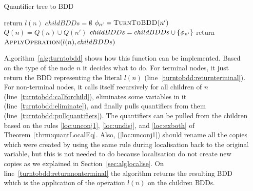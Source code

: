 \documentclass[
  digital, %
  color,
  twoside, %
  table,   %
  nolof,     %
  nolot,     %
]{fithesis3}
\let\setbuilder\set
\newcommand{\simpleset}[1]{\{{#1}\}}
\renewcommand{\set}[1]{\normalexpandarg\IfSubStr{#1}{|}{\setbuilder{#1}}{\simpleset{#1}}}
\theoremstyle{definition}
\theoremstyle{remark}
\newcommand{\qtlabel}[1]{l({#1})}
\newcommand{\prefix}[1]{Q({#1})}
\newcommand{\children}[1]{children({#1})}
\begin{document}
\begin{algorithm}
  \caption{Quantifier tree to BDD}
  \label{alg:turntobdd}
  \begin{algorithmic}[1]
      \If{$\qtlabel{n}$ is a literal}
        \State return $\qtlabel{n}$ \label{turntobdd:returnterminal}
      \Else
        \State $childBDDs = \emptyset$
        \ForAll{$n' \in \children{n}$}
          \State $\phi_{n'} = \Call{TurnToBDD}{n'}$ \label{turntobdd:callforchild}
          \State {} \label{turntobdd:eliminate}
          \State $\prefix{n} = \prefix{n} \cup \prefix{n'}$ \label{turntobdd:pullquantifiers}
          \State $childBDDs = childBDDs \cup \set{\phi_{n'}}$ %
        \EndFor
        \State return $\Call{ApplyOperation}{\qtlabel{n}, childBDDs}$ \label{turntobdd:returnnonterminal}
      \EndIf
    \EndFunction
  \end{algorithmic}
\end{algorithm}

Algorithm~\ref{alg:turntobdd} shows how this function can be implemented. Based on the type of the node $n$ it decides what to do. For terminal nodes, it just return the BDD representing the literal $\qtlabel{n}$ (line~\ref{turntobdd:returnterminal}). For non-terminal nodes, it calls itself recursively for all children of $n$ (line~\ref{turntobdd:callforchild}), eliminates some variables in it (line~\ref{turntobdd:eliminate}), and finally pulls quantifiers from them (line~\ref{turntobdd:pullquantifiers}). The quantifiers can be pulled from the children based on the rules \eqref{loc:unconj1}, \eqref{loc:undisj}, and \eqref{loc:exboth} of Theorem~\ref{thrm:quantLocalEq}. Also, (\ref{loc:unconj1}) should rename all the copies which were created by using the same rule during localisation back to the original variable, but this is not needed to do because localisation do not create new copies as we explained in Section~\ref{sec:alglocalise}. On line~\ref{turntobdd:returnnonterminal} the algorithm returns the resulting BDD which is the application of the operation $\qtlabel{n}$ on the children BDDs.
\end{document}
